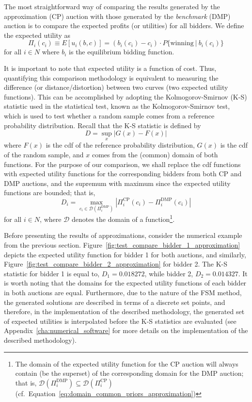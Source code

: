 The most straightforward way of comparing the results generated by the approximation (CP) auction with those generated by the \emph{benchmark} (DMP) auction is to compare the expected profits (or utilities) for all bidders. We define the expected utility as
\begin{equation}
  \label{eq:expected_utility_approximation}
  \Pi_i(c_i) \equiv E[u_i(b,c)] = (b_i(c_i) - c_i)\cdot P\{\textrm{winning}\:\vert\: b_i(c_i)\}
\end{equation}
for all $i\in N$ where $b_i$ is the equilibrium bidding function.

It is important to note that expected utility is a function of cost. Thus, quantifying this comparison methodology is equivalent to measuring the difference (or distance/distortion) between two curves (two expected utility functions). This can be accomplished by adopting the Kolmogorov-Smirnov (K-S) statistic used in the statistical test, known as the Kolmogorov-Smirnov test, which is used to test whether a random sample comes from a reference probability distribution. Recall that the K-S statistic is defined by
\begin{equation*}
  D = \sup_x |G(x) - F(x)|
\end{equation*}
where $F(x)$ is the cdf of the reference probability distribution, $G(x)$ is the cdf of the random sample, and $x$ comes from the (common) domain of both functions. For the purpose of our comparison, we shall replace the cdf functions with expected utility functions for the corresponding bidders from both CP and DMP auctions, and the supremum with maximum since the expected utility functions are bounded; that is,
\begin{equation}
  \label{eq:k_s_statistic_approximation}
  \displaystyle D_i = \max_{c_i\in \mathscr{D}(\Pi_i^\textrm{DMP})} \left\vert\Pi_i^{\textrm{CP}}(c_i) - \Pi_i^{\textrm{DMP}}(c_i)\right\vert
\end{equation}
for all $i\in N$, where $\mathscr{D}$ denotes the domain of a function\footnote{The domain of the expected utility function for the CP auction will always contain (be the superset) of the corresponding domain for the DMP auction; that is, $\mathscr{D}(\Pi_i^\textrm{DMP})\subseteq\mathscr{D}(\Pi_i^\textrm{CP})$ (cf.~Equation~\eqref{eq:domain_common_priors_approximation})}.

Before presenting the results of approximations, consider the numerical example from the previous section. Figure~\ref{fig:test_compare_bidder_1_approximation} depicts the expected utility function for bidder 1 for both auctions, and similarly, Figure~\ref{fig:test_compare_bidder_2_approximation} for bidder 2. The K-S statistic for bidder 1 is equal to, $D_1=0.018272$, while bidder 2, $D_2=0.014327$. It is worth noting that the domains for the expected utility functions of each bidder in both auctions are equal. Furthermore, due to the nature of the FSM method, the generated solutions are described in terms of a discrete set points, and therefore, in the implementation of the described methodology, the generated set of expected utilities is interpolated before the K-S statistics are evaluated (see Appendix~\ref{cha:numerical_software} for more details on the implementation of the described methodology).

